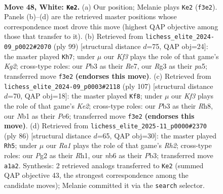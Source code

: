 \documentclass[11pt]{article}
\begin{document}
\clearpage

\begin{figure}[p]\centering
\begin{subfigure}{0.46\textwidth}\centering
\resizebox{\linewidth}{!}{%
\newchessgame
\chessboard[
  setfen={6k1/2r2p1p/1n4p1/p3p1P1/P3P3/1P3KRP/6P1/RN1r4 w - - 10 48},
  showmover=false,
  pgfstyle=straightmove, color=movearrow, markmove={f3-e2}
]}
\caption{}
\end{subfigure}\hfill
\begin{subfigure}{0.46\textwidth}\centering
\resizebox{\linewidth}{!}{%
\newchessgame
\chessboard[
  setfen={8/4rpk1/p2Np3/P1p1n1rP/4P1p1/1PP5/2K3R1/5R2 b - - 5 50},
  showmover=false,
  pgfstyle=straightmove, color=movearrow, markmove={g7-h7}
]}
\caption{}
\end{subfigure}
\\[4pt]
\begin{subfigure}{0.46\textwidth}\centering
\resizebox{\linewidth}{!}{%
\newchessgame
\chessboard[
  setfen={7r/4kp2/1p1rp2p/p1p4P/P1B2PN1/1P3K2/5P2/4R3 b - - 10 54},
  showmover=false,
  pgfstyle=straightmove, color=movearrow, markmove={e7-f8}
]}
\caption{}
\end{subfigure}\hfill
\begin{subfigure}{0.46\textwidth}\centering
\resizebox{\linewidth}{!}{%
\newchessgame
\chessboard[
  setfen={6r1/2p4r/1p2k2P/p1p1p3/P7/1P1PK3/2P4R/7R w - - 1 44},
  showmover=false,
  pgfstyle=straightmove, color=movearrow, markmove={h2-h5}
]}
\caption{}
\end{subfigure}
\caption{\textbf{Move 48, White: \texttt{Ke2}.} (a) Our position; Melanie plays \texttt{Ke2} (\texttt{f3e2}). Panels (b)--(d) are the retrieved master positions whose correspondence most drove this move (highest QAP objective among those that transfer to it). (b) Retrieved from \texttt{lichess\_elite\_2024-09\_p0022\#2070} (ply 99) [structural distance $d$=75, QAP obj=24]: the master played \texttt{Kh7}; under $\mu$ our \emph{Kf3} plays the role of that game's \emph{Kg2}; cross-type roles: our \emph{P}b3 as their \emph{R}e7, our \emph{R}g3 as their \emph{p}a5; transferred move \texttt{f3e2} \textbf{(endorses this move)}. (c) Retrieved from \texttt{lichess\_elite\_2024-09\_p0003\#2118} (ply 107) [structural distance $d$=70, QAP obj=18]: the master played \texttt{Kf8}; under $\mu$ our \emph{Kf3} plays the role of that game's \emph{Ke2}; cross-type roles: our \emph{P}b3 as their \emph{R}h8, our \emph{N}b1 as their \emph{P}e6; transferred move \texttt{f3e2} \textbf{(endorses this move)}. (d) Retrieved from \texttt{lichess\_elite\_2025-11\_p0000\#2370} (ply 86) [structural distance $d$=65, QAP obj=30]: the master played \texttt{Rh5}; under $\mu$ our \emph{Ra1} plays the role of that game's \emph{Rh2}; cross-type roles: our \emph{P}g2 as their \emph{R}h1, our \emph{n}b6 as their \emph{P}b3; transferred move \texttt{a1a2}. Synthesis: 2 retrieved analogs transferred to \texttt{Ke2} (summed QAP objective 43, the strongest correspondence among the candidate moves); Melanie committed it via the \texttt{search} selector.}
\label{fig:thought-m94}
\end{figure}
\end{document}
